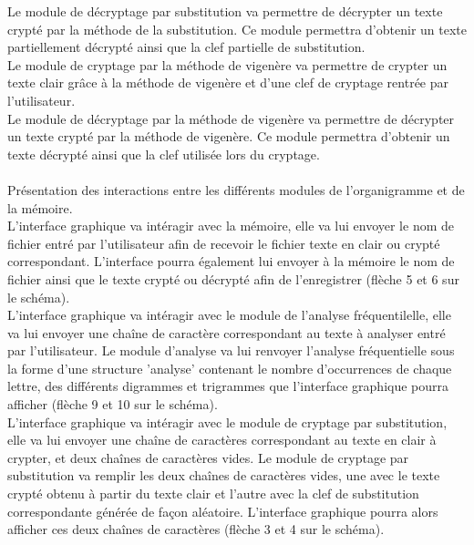 \documentclass[a4]{article}
\begin{document}
	 Le module de décryptage par substitution va permettre de décrypter un texte crypté par la méthode de la substitution.
	 Ce module permettra d'obtenir un texte partiellement décrypté ainsi que la clef partielle de substitution. \\

 	 Le module de cryptage par la méthode de vigenère va permettre de crypter un texte clair grâce à la méthode de vigenère
	 et d'une clef de cryptage rentrée par l'utilisateur. \\

	 Le module de décryptage par la méthode de vigenère va permettre de décrypter un texte crypté par la méthode de vigenère. 
	 Ce module permettra d'obtenir un texte décrypté ainsi que la clef utilisée lors du cryptage. \\ \\

	
Présentation des interactions entre les différents modules de l'organigramme et de la mémoire. \\

	L'interface graphique va intéragir avec la mémoire, elle va lui envoyer le nom de fichier entré par l'utilisateur 
	afin de recevoir le fichier texte en clair ou crypté correspondant. L'interface pourra également lui envoyer à la 
	mémoire le nom de fichier ainsi que le texte crypté ou décrypté afin de l'enregistrer (flèche 5 et 6 sur le schéma). \\

	L'interface graphique va intéragir avec le module de l'analyse fréquentilelle, elle va lui envoyer une chaîne de 
	caractère correspondant au texte à analyser entré par l'utilisateur. Le module d'analyse va lui renvoyer l'analyse 
	fréquentielle sous la forme d'une structure 'analyse' contenant le nombre d'occurrences de chaque lettre, des différents
	digrammes et trigrammes que l'interface graphique pourra afficher (flèche 9 et 10 sur le schéma). \\

	L'interface graphique va intéragir avec le module de cryptage par substitution, elle va lui envoyer une 
	chaîne de caractères correspondant au texte en clair à crypter, et deux chaînes de caractères vides. Le module
	de cryptage par substitution va remplir les deux chaînes de caractères vides, une avec le texte crypté obtenu
	à partir du texte clair et l'autre avec la clef de substitution correspondante générée de façon aléatoire.
	L'interface graphique pourra alors afficher ces deux chaînes de caractères (flèche 3 et 4 sur le schéma). \\
\end{document}
